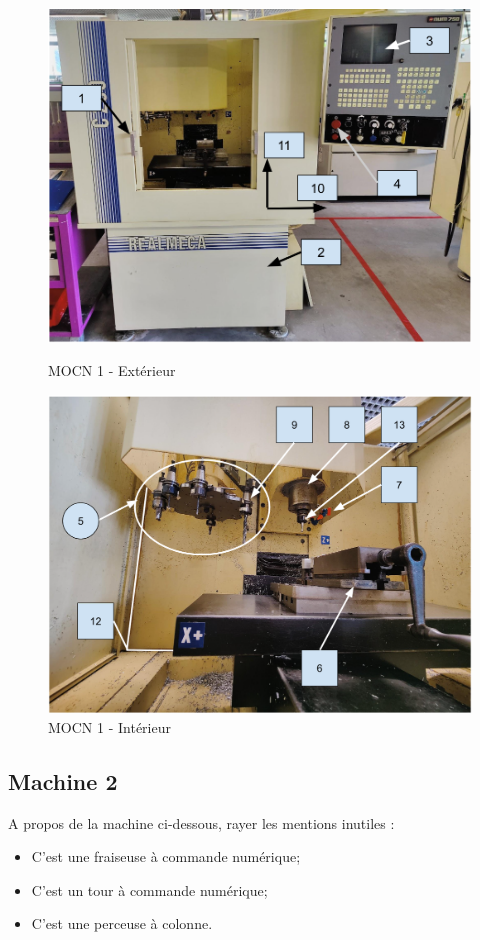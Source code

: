 \documentclass[12pt]{article}
\newcounter{exo}
\newenvironment{exo}{\stepcounter{exo}\vspace{0.5cm}{\bfseries Question \theexo\ :}}{\par\vspace{0.5cm}}
\begin{document}
\begin{figure}
\centering
\includegraphics[width=0.7\linewidth]{MOCN11.PNG}
\caption{MOCN 1 - Extérieur}
\label{MOCN11}


\centering
\includegraphics[width=0.7\linewidth]{MOCN12.PNG}
\caption{MOCN 1 - Intérieur}
\label{MOCN12}
\end{figure}











\subsection{Machine 2}

\begin{exo}\label{exo1} A propos de la machine ci-dessous, rayer les mentions inutiles :
\begin{itemize}
    \item C'est une fraiseuse à commande numérique;
    \item C'est un tour à commande numérique;
    \item C'est une perceuse à colonne.
\end{itemize}
\end{exo}
\end{document}
